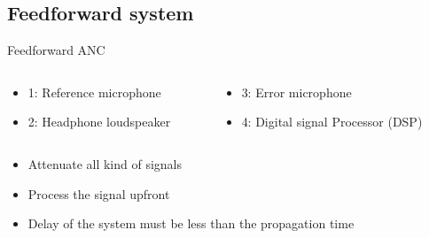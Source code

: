 \subsection{Feedforward system}
\begin{frame}{Feedforward ANC}
	\begin{columns}	
			\begin{column}{0.5\textwidth}
			\begin{itemize}
			\item 1: Reference microphone
			\item 2: Headphone loudspeaker
			\end{itemize}
			\end{column}		
	\begin{column}{0.5\textwidth} 
	\begin{itemize}
			\item 3: Error microphone
			\item 4: Digital signal Processor (DSP)
	\end{itemize}
	\end{column}	
	\end{columns}	
	
	\begin{itemize}
			\item Attenuate all kind of signals
			\item Process the signal upfront
			\item Delay of the system must be less than the propagation time
	\end{itemize}		
\end{frame}

